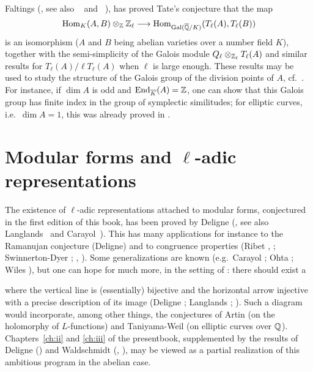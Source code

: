 Faltings (\cite{54}, see also \citeauthor{82}~\cite{82} and
\citeauthor{56}~\cite{56}), has proved Tate's conjecture that the map
\[
	\operatorname{Hom}_K(A, B) \otimes_{\mathbb{Z}} \mathbb{Z}_\ell \longrightarrow
	\operatorname{Hom}_{\operatorname{Gal}(\overline{\mathbb{Q}}/K)}(T_\ell(A), T_\ell(B))
\]
is an isomorphism ($A$ and $B$ being abelian varieties over a number field
$K$), together with the semi-simplicity of the Galois module $Q_\ell
\otimes_{\mathbb{Z}_\ell} T_\ell(A)$ and similar results for $T_\ell(A)/\ell T_\ell(A)$
when $\ell$ is large enough. These results may be used to study the structure
of the Galois group of the division points of $A$, cf.\ \cite{80}. For
instance, if $\dim A$ is odd and $\operatorname{End}_{\overline{K}}(A) = \mathbb{Z}$, one can show that
this Galois group has finite index in the group of symplectic similitudes; for
elliptic curves, i.e.\ $\dim A = 1$, this was already proved in \cite{76}.

\section*{Modular forms and \texorpdfstring{$\ell$}{ℓ}-adic representations}
The existence of $\ell$-adic representations attached to modular forms,
conjectured in the first edition of this book, has been proved by Deligne
(\cite{50}, see also Langlands~\cite{65} and Carayol~\cite{49}). This has many
applications for instance to the Ramanujan conjecture (Deligne) and to
congruence properties (Ribet \cite{69}, \cite{71}; Swinnerton-Dyer \cite{81};
\cite{73}, \cite{77}). Some generalizations are known (e.g.\ Carayol \cite{49};
Ohta \cite{68}; Wiles \cite{84}), but one can hope for much more, in the
setting of : there should exist a
\begin{figure}[!hbt]
	\centering
\end{figure}

\noindent
where the vertical line is (essentially) bijective and the horizontal arrow
injective with a precise description of its image (Deligne \cite{51}; Langlands
\cite{66}; \cite{78}). Such a diagram would incorporate, among other things,
the conjectures of Artin (on the holomorphy of $L$-functions) and Taniyama-Weil
(on elliptic curves over $\mathbb{Q}$). Chapters~\ref{ch:ii} and \ref{ch:iii} of the
presentbook, supplemented by the results of Deligne (\cite{53}) and Waldschmidt
(\cite{63}, \cite{83}), may be viewed as a partial realization of this
ambitious program in the abelian case.

